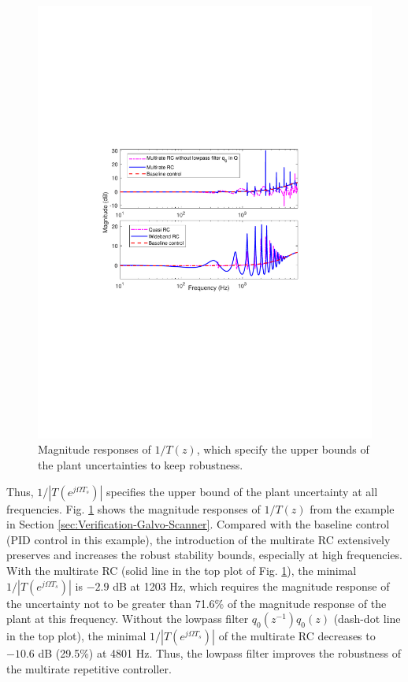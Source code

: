 \documentclass [11pt, proquest] {uwthesis}[2020/02/24]
\begin{document}
\begin{figure}[!ht]
\begin{centering}
\includegraphics[width=12cm]{Fractional-order-RC/stability_all}
\par\end{centering}
\caption{\label{fig:invT-multirate-RC}Magnitude responses of $1/T(z)$, which
specify the upper bounds of the plant uncertainties to keep robustness.}
\end{figure}

Thus, $1/|T(e^{j\Omega T_{s}})|$ specifies the upper bound of the
plant uncertainty at all frequencies. Fig. \ref{fig:invT-multirate-RC}
shows the magnitude responses of $1/T(z)$ from the example in Section
\ref{sec:Verification-Galvo-Scanner}. Compared with the baseline control
(PID control in this example), the introduction of the multirate RC
extensively preserves and increases the robust stability bounds, especially
at high frequencies. With the multirate RC (solid line in the top
plot of Fig. \ref{fig:invT-multirate-RC}), the minimal $1/|T(e^{j\Omega T_{s}})|$
is $-2.9$ dB at 1203 Hz, which requires the magnitude response of
the uncertainty not to be greater than 71.6\% of the magnitude response
of the plant at this frequency. Without the lowpass filter $q_{0}(z^{-1})q_{0}(z)$
(dash-dot line in the top plot), the minimal $1/|T(e^{j\Omega T_{s}})|$
of the multirate RC decreases to $-10.6$ dB (29.5\%) at 4801 Hz.
Thus, the lowpass filter improves the robustness of the multirate
repetitive controller.
\end{document}
